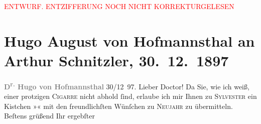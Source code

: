 
\begin{center}
            \textcolor{red}{ENTWURF. ENTZIFFERUNG NOCH NICHT KORREKTURGELESEN}
                      \end{center}
            
               \section[Hugo August von Hofmannsthal an Arthur Schnitzler, 30. 12. 1897]{ Hugo August von Hofmannsthal an Arthur Schnitzler, 30. 12. 1897}\nopagebreak{}\rehead{ }\begin{ledgroupsized}[t]{13cm}\normalsize\beginnumbering{} \toendnotes[C]{\smallbreak\pagebreak[2]} 
\toendnotes[C]{\smallbreak}\pstart
           \noindent{}\centering{}{\pb}\textcolor{gray}{\textbf{D\textsuperscript{r.} Hugo von Hofmannsthal}}\pend
           \pstart
           \raggedleft{}{\pb}30/12 97.\pend
           \pstart{}Lieber Doctor!\pend\pstart
           Da Sie, wie ich weiß, einer protzigen \textsc{Cigarre} nicht abhold
               ſind, erlaube ich mir Ihnen zu \textsc{Sylvester} ein Kistchen\pend
           \pstart
           \centering{}»\textsc{\label{K_L00756_1v}\label{K_L00756_1h}}«\pend
           \pstart
           \noindent{}mit den freundlichſten Wünſchen zu \textsc{Neujahr} zu
               übermitteln.\pend
           \pstart Beſtens grüßend Ihr ergebſter\pend{}\endnumbering{}\end{ledgroupsized}  \newcommand{\dateiname}{L00756}\newcommand{\titel}{Hugo August von Hofmannsthal an Arthur Schnitzler, 30. 12. 1897}\newcommand{\editorInnen}{Martin Anton Müller und Gerd-Hermann Susen}
      